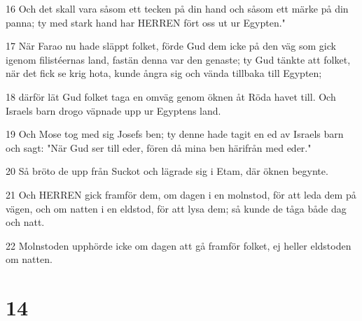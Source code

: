\par 16 Och det skall vara såsom ett tecken på din hand och såsom ett märke på din panna; ty med stark hand har HERREN fört oss ut ur Egypten."
\par 17 När Farao nu hade släppt folket, förde Gud dem icke på den väg som gick igenom filistéernas land, fastän denna var den genaste; ty Gud tänkte att folket, när det fick se krig hota, kunde ångra sig och vända tillbaka till Egypten;
\par 18 därför lät Gud folket taga en omväg genom öknen åt Röda havet till. Och Israels barn drogo väpnade upp ur Egyptens land.
\par 19 Och Mose tog med sig Josefs ben; ty denne hade tagit en ed av Israels barn och sagt: "När Gud ser till eder, fören då mina ben härifrån med eder."
\par 20 Så bröto de upp från Suckot och lägrade sig i Etam, där öknen begynte.
\par 21 Och HERREN gick framför dem, om dagen i en molnstod, för att leda dem på vägen, och om natten i en eldstod, för att lysa dem; så kunde de tåga både dag och natt.
\par 22 Molnstoden upphörde icke om dagen att gå framför folket, ej heller eldstoden om natten.

\chapter{14}

